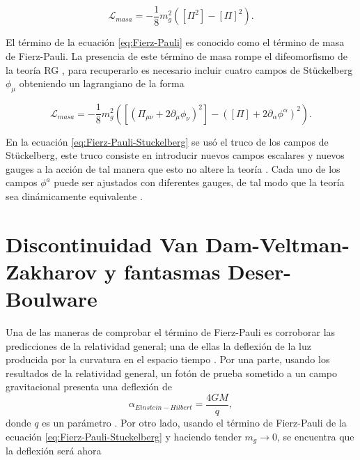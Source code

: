 \begin{equation}
    \mathcal{L}_{masa}=-\dfrac{1}{8}m_g^2([\Pi^2]-[\Pi]^2).
    \label{eq:Fierz-Pauli}
\end{equation}

El término de la ecuación \eqref{eq:Fierz-Pauli} es conocido como el término de masa de Fierz-Pauli. La presencia de este término de masa rompe el difeomorfismo de la teoría RG \cite{MassiveGravity}, para recuperarlo es necesario incluir cuatro campos de St\"{u}ckelberg $\phi_\mu$ obteniendo un lagrangiano de la forma 

\begin{equation}
    \mathcal{L}_{masa}=-\dfrac{1}{8}m_g^2([(\Pi_{\mu\nu}+2\partial_\mu\phi_\nu)^2]-([\Pi]+2\partial_\alpha\phi^\alpha)^2).
    \label{eq:Fierz-Pauli-Stuckelberg}
\end{equation}

En la ecuación \eqref{eq:Fierz-Pauli-Stuckelberg} se usó el truco de los campos de St\"{u}ckelberg, este truco consiste en introducir nuevos campos escalares y nuevos gauges a la acción de tal manera que esto no altere la teoría \cite{TheoreticalAspectsOfMassiveGRavity}. Cada uno de los campos $\phi^a$ puede ser ajustados con diferentes gauges, de tal modo que la teoría sea dinámicamente equivalente \cite{TheoreticalAspectsOfMassiveGRavity,Helicity}.\\

\section{Discontinuidad Van Dam-Veltman-Zakharov y fantasmas Deser-Boulware}

Una de las maneras de comprobar el término de Fierz-Pauli es corroborar las predicciones de la relatividad general; una de ellas la deflexión de la luz producida por la curvatura en el espacio tiempo \cite{TheoreticalAspectsOfMassiveGRavity}. Por una parte, usando los resultados de la relatividad general, un fotón de prueba sometido a un campo gravitacional presenta una deflexión de
\begin{equation}
    \alpha_{Einstein-Hilbert}=\dfrac{4GM}{q},
\end{equation} 
donde $q$ es un parámetro \cite{Discontinuidad}. Por otro lado, usando el término de Fierz-Pauli de la ecuación \eqref{eq:Fierz-Pauli-Stuckelberg} y haciendo tender $m_g\rightarrow0$, se encuentra que la deflexión será ahora \cite{TheoreticalAspectsOfMassiveGRavity,Discontinuidad}

